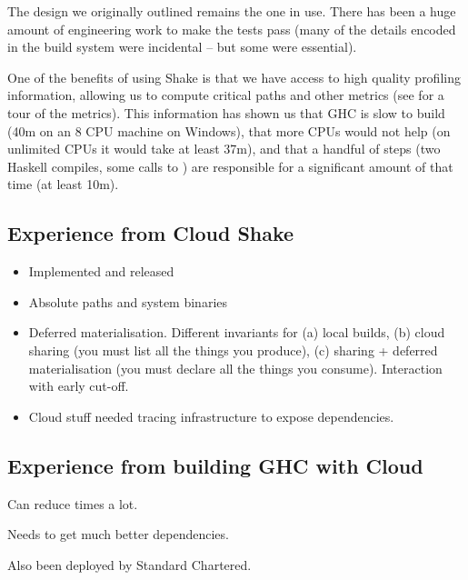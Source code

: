 The design we originally outlined remains the one in use. There has been a huge amount of engineering work to make the tests pass (many of the details encoded in the \Make build system were incidental -- but some were essential).

One of the benefits of using Shake is that we have access to high quality profiling information, allowing us to compute critical paths and other metrics (see \cite{mitchell2019ghcrebuildtimes} for a tour of the metrics). This information has shown us that GHC is slow to build (40m on an 8 CPU machine on Windows), that more CPUs would not help (on unlimited CPUs it would take at least 37m), and that a handful of steps (two Haskell compiles, some calls to ) are responsible for a significant amount of that time (at least 10m).


\subsection{Experience from Cloud Shake}\label{sec-cloud-shake}

\begin{itemize}
\item Implemented and released
\item Absolute paths and system binaries
\item Deferred materialisation. Different invariants for (a) local builds, (b) cloud sharing (you must list all the things you produce), (c) sharing + deferred materialisation (you must declare all the things you consume). Interaction with early cut-off.
\item  Cloud stuff needed tracing infrastructure to expose dependencies.
\end{itemize}

\subsection{Experience from building GHC with Cloud \Shake}

Can reduce times a lot.

Needs to get much better dependencies.

Also been deployed by Standard Chartered.
